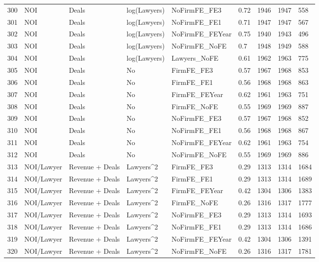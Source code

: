 \begin{table}[ht]
\begin{tabular}{rllllllll}
  300 & NOI & Deals & log(Lawyers) & NoFirmFE\_FE3 & 0.72 & 1946 & 1947 & 558 \\ 
  301 & NOI & Deals & log(Lawyers) & NoFirmFE\_FE1 & 0.71 & 1947 & 1947 & 567 \\ 
  302 & NOI & Deals & log(Lawyers) & NoFirmFE\_FEYear & 0.75 & 1940 & 1943 & 496 \\ 
  303 & NOI & Deals & log(Lawyers) & NoFirmFE\_NoFE & 0.7 & 1948 & 1949 & 588 \\ 
  304 & NOI & Deals & log(Lawyers) & Lawyers\_NoFE & 0.61 & 1962 & 1963 & 775 \\ 
  305 & NOI & Deals & No & FirmFE\_FE3 & 0.57 & 1967 & 1968 & 853 \\ 
  306 & NOI & Deals & No & FirmFE\_FE1 & 0.56 & 1968 & 1968 & 863 \\ 
  307 & NOI & Deals & No & FirmFE\_FEYear & 0.62 & 1961 & 1963 & 751 \\ 
  308 & NOI & Deals & No & FirmFE\_NoFE & 0.55 & 1969 & 1969 & 887 \\ 
  309 & NOI & Deals & No & NoFirmFE\_FE3 & 0.57 & 1967 & 1968 & 852 \\ 
  310 & NOI & Deals & No & NoFirmFE\_FE1 & 0.56 & 1968 & 1968 & 867 \\ 
  311 & NOI & Deals & No & NoFirmFE\_FEYear & 0.62 & 1961 & 1963 & 754 \\ 
  312 & NOI & Deals & No & NoFirmFE\_NoFE & 0.55 & 1969 & 1969 & 886 \\ 
  313 & NOI/Lawyer & Revenue + Deals & Lawyers^2 & FirmFE\_FE3 & 0.29 & 1313 & 1314 & 1684 \\ 
  314 & NOI/Lawyer & Revenue + Deals & Lawyers^2 & FirmFE\_FE1 & 0.29 & 1313 & 1314 & 1689 \\ 
  315 & NOI/Lawyer & Revenue + Deals & Lawyers^2 & FirmFE\_FEYear & 0.42 & 1304 & 1306 & 1383 \\ 
  316 & NOI/Lawyer & Revenue + Deals & Lawyers^2 & FirmFE\_NoFE & 0.26 & 1316 & 1317 & 1777 \\ 
  317 & NOI/Lawyer & Revenue + Deals & Lawyers^2 & NoFirmFE\_FE3 & 0.29 & 1313 & 1314 & 1693 \\ 
  318 & NOI/Lawyer & Revenue + Deals & Lawyers^2 & NoFirmFE\_FE1 & 0.29 & 1313 & 1314 & 1686 \\ 
  319 & NOI/Lawyer & Revenue + Deals & Lawyers^2 & NoFirmFE\_FEYear & 0.42 & 1304 & 1306 & 1391 \\ 
  320 & NOI/Lawyer & Revenue + Deals & Lawyers^2 & NoFirmFE\_NoFE & 0.26 & 1316 & 1317 & 1781 \\ 
   \hline
\end{tabular}
\end{table}
